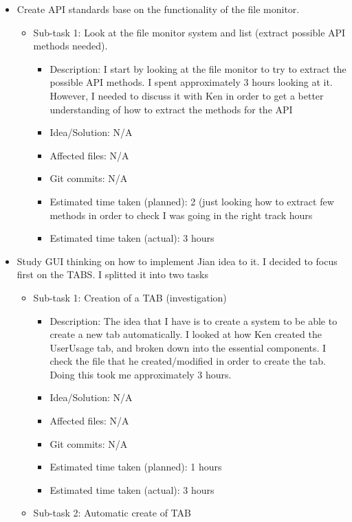 \documentclass{article}
\begin{document}
\begin{itemize}
	\item Create API standards base on the functionality of the file monitor.
	     \begin{itemize}
	        \item Sub-task 1: Look at the file monitor system and list (extract possible API methods needed).
	           \begin{itemize}
		   	\item Description: I start by looking at the file monitor to try to extract the possible API methods.  I spent approximately 3 hours looking at it.  However, I needed to discuss it with Ken in order to get a better understanding of how to extract the methods for the API
			\item Idea/Solution: N/A
			\item Affected files: N/A
			\item Git commits: N/A
			\item Estimated time taken (planned): 2 (just looking how to extract few methods in order to check I was going in the right track hours
			\item Estimated time taken (actual): 3 hours
		\end{itemize}
	     \end{itemize}
	\item Study GUI thinking on how to implement Jian idea to it.  I decided to focus first on the TABS.  I splitted it into two tasks
	     \begin{itemize}
	         \item Sub-task 1: Creation of a TAB (investigation)
	            \begin{itemize}
	         	\item Description: The idea that I have is to create a system to be able to create a new tab automatically.  I looked at how Ken created the UserUsage tab, and broken down into the essential components.  I check the file that he created/modified in order to create the tab.  Doing this took me approximately 3 hours.
			\item Idea/Solution: N/A
			\item Affected files: N/A
			\item Git commits: N/A
			\item Estimated time taken (planned): 1 hours
			\item Estimated time taken (actual): 3 hours
		  \end{itemize}
	         \item Sub-task 2: Automatic create of TAB

\end{itemize}
\end{itemize}
\end{document}
